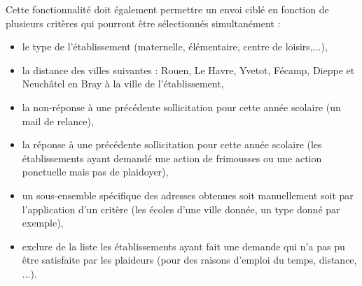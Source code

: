 Cette fonctionnalité doit également permettre un envoi ciblé en fonction de plusieurs critères qui pourront être sélectionnés simultanément :
\begin{itemize}
\item le type de l'établissement (maternelle, élémentaire, centre de loisirs,...), 
\item la distance des villes suivantes : Rouen, Le Havre, Yvetot, Fécamp, Dieppe et Neuchâtel en Bray à la ville de l'établissement,
\item la non-réponse à une précédente sollicitation pour cette année scolaire (un mail de relance),
\item la réponse à une précédente sollicitation pour cette année scolaire (les établissements ayant demandé une action de frimousses ou une action ponctuelle mais pas de plaidoyer),
\item un sous-ensemble spécifique des adresses obtenues soit manuellement soit par l'application d'un critère (les écoles d'une ville donnée, un type donné par exemple),
\item exclure de la liste les établissements ayant fait une demande qui n'a pas pu être satisfaite par les plaideurs (pour des raisons d'emploi du temps, distance, ...). \\
\end{itemize}

